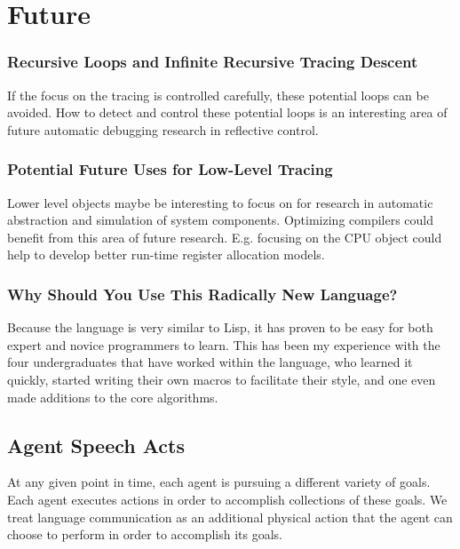 \chapter{Future}\label{ch:future}

\subsection{Recursive Loops and Infinite Recursive Tracing Descent}

If the focus on the tracing is controlled carefully, these potential
loops can be avoided.  How to detect and control these potential loops
is an interesting area of future automatic debugging research in
reflective control.

\subsection{Potential Future Uses for Low-Level Tracing}

Lower level objects maybe be interesting to focus on for research in
automatic abstraction and simulation of system components.  Optimizing
compilers could benefit from this area of future research.  E.g.
focusing on the CPU object could help to develop better run-time
register allocation models.

\subsection{Why Should You Use This Radically New Language?}

Because the language is very similar to Lisp, it has proven to be easy
for both expert and novice programmers to learn.  This has been my
experience with the four undergraduates that have worked within the
language, who learned it quickly, started writing their own macros to
facilitate their style, and one even made additions to the core
algorithms.

\section{Agent Speech Acts}

At any given point in time, each agent is pursuing a different variety
of goals.  Each agent executes actions in order to accomplish
collections of these goals.  We treat language communication as an
additional physical action that the agent can choose to perform in
order to accomplish its goals.

